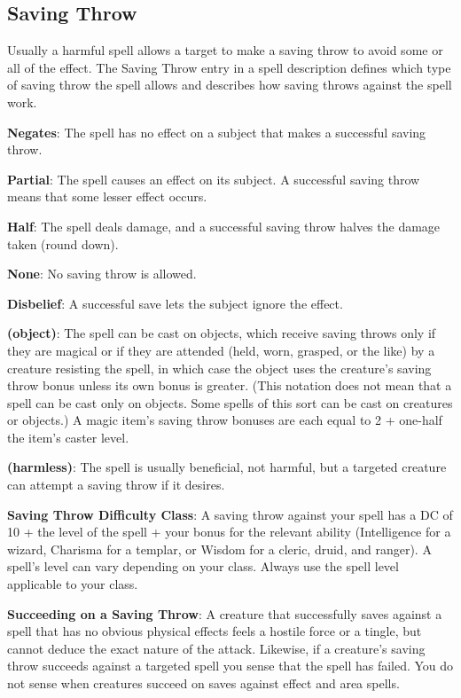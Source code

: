 \subsection{Saving Throw}
Usually a harmful spell allows a target to make a saving throw to avoid some or all of the effect. The Saving Throw entry in a spell description defines which type of saving throw the spell allows and describes how saving throws against the spell work.

\textbf{Negates}: The spell has no effect on a subject that makes a successful saving throw.

\textbf{Partial}: The spell causes an effect on its subject. A successful saving throw means that some lesser effect occurs.

\textbf{Half}: The spell deals damage, and a successful saving throw halves the damage taken (round down).

\textbf{None}: No saving throw is allowed.

\textbf{Disbelief}: A successful save lets the subject ignore the effect.

\textbf{(object)}: The spell can be cast on objects, which receive saving throws only if they are magical or if they are attended (held, worn, grasped, or the like) by a creature resisting the spell, in which case the object uses the creature's saving throw bonus unless its own bonus is greater. (This notation does not mean that a spell can be cast only on objects. Some spells of this sort can be cast on creatures or objects.) A magic item's saving throw bonuses are each equal to 2 + one-half the item's caster level.

\textbf{(harmless)}: The spell is usually beneficial, not harmful, but a targeted creature can attempt a saving throw if it desires.

\textbf{Saving Throw Difficulty Class}: A saving throw against your spell has a DC of 10 + the level of the spell + your bonus for the relevant ability (Intelligence for a wizard, Charisma for a templar, or Wisdom for a cleric, druid, and ranger). A spell's level can vary depending on your class. Always use the spell level applicable to your class.

\textbf{Succeeding on a Saving Throw}: A creature that successfully saves against a spell that has no obvious physical effects feels a hostile force or a tingle, but cannot deduce the exact nature of the attack. Likewise, if a creature's saving throw succeeds against a targeted spell you sense that the spell has failed. You do not sense when creatures succeed on saves against effect and area spells.

